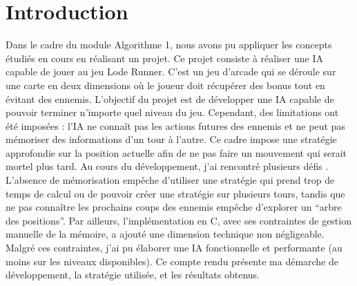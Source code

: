 \chapter{Introduction}
\label{cp:introduction}
Dans le cadre du module Algorithme 1, nous avons pu appliquer les concepts étudiés en cours en réalisant un projet. Ce projet consiste à réaliser une IA capable de jouer au jeu Lode Runner. C'est un jeu d'arcade qui se déroule sur une carte en deux dimensions où le joueur doit récupérer des bonus tout en évitant des ennemis. 
\newline\newline
L'objectif du projet est de développer une IA capable de pouvoir terminer n'importe quel niveau du jeu. Cependant, des limitations ont été imposées : l'IA ne connaît pas les actions futures des ennemis et ne peut pas mémoriser des informations d'un tour à l'autre. Ce cadre impose une stratégie approfondie sur la position actuelle afin de ne pas faire un mouvement qui serait mortel plus tard.
\newline\newline
Au cours du développement, j'ai rencontré plusieurs défis . L'absence de mémorisation empêche d'utiliser une stratégie qui prend trop de temps de calcul ou de pouvoir créer une stratégie sur plusieurs tours, tandis que ne pas connaître les prochains coups des ennemis empêche d'explorer un “arbre des positions”. Par ailleurs, l'implémentation en C, avec ses contraintes de gestion manuelle de la mémoire, a ajouté une dimension technique non négligeable.
\newline\newline
Malgré ces contraintes, j'ai pu élaborer une IA fonctionnelle et performante (au moins sur les niveaux disponibles).
\newline\newline
Ce compte rendu présente ma démarche de développement, la stratégie utilisée, et les résultats obtenus.